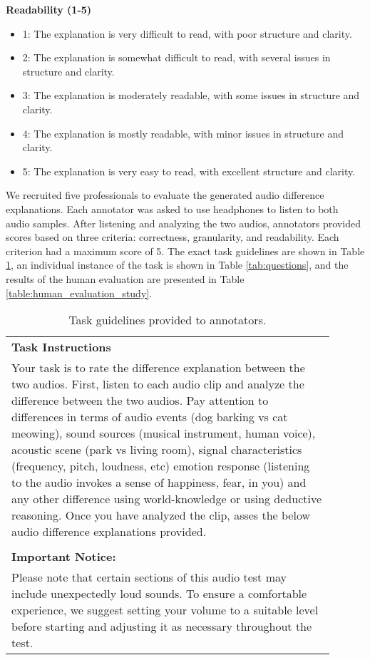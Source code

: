 \textbf{Readability (1-5)}  \vspace{-0.1in}
\begin{itemize}
    \item 1: The explanation is very difficult to read, with poor structure and clarity.
    \item 2: The explanation is somewhat difficult to read, with several issues in structure and clarity.
    \item 3: The explanation is moderately readable, with some issues in structure and clarity.
    \item 4: The explanation is mostly readable, with minor issues in structure and clarity.
    \item 5: The explanation is very easy to read, with excellent structure and clarity.
\end{itemize}

We recruited five professionals to evaluate the generated audio difference explanations. Each annotator was asked to use headphones to listen to both audio samples. After listening and analyzing the two audios, annotators provided scores based on three criteria: correctness, granularity, and readability. Each criterion had a maximum score of 5. The exact task guidelines are shown in Table \ref{tab:instruction_ttm}, an individual instance of the task is shown in Table \ref{tab:questions}, and the results of the human evaluation are presented in Table \ref{table:human_evaluation_study}.

\begin{table}[ht!]
\centering
\small 
\begin{tabular}{p{0.9\linewidth}}
\toprule\toprule
\textbf{Task Instructions} \\
Your task is to rate the difference explanation between the two audios. First, listen to each audio clip and analyze the difference between the two audios. Pay attention to differences in terms of audio events (dog barking vs cat meowing), sound sources (musical instrument, human voice), acoustic scene (park vs living room), signal characteristics (frequency, pitch, loudness, etc) emotion response (listening to the audio invokes a sense of happiness, fear, in you) and any other difference using world-knowledge or using deductive reasoning. Once you have analyzed the clip, asses the below audio difference explanations provided. \\ \\

\textbf{Important Notice: } \\
Please note that certain sections of this audio test may include unexpectedly loud sounds. To ensure a comfortable experience, we suggest setting your volume to a suitable level before starting and adjusting it as necessary throughout the test. \\
\bottomrule \bottomrule
\end{tabular}
\caption{\small Task guidelines provided to annotators.\label{tab:instruction_ttm}
}
\end{table} 

